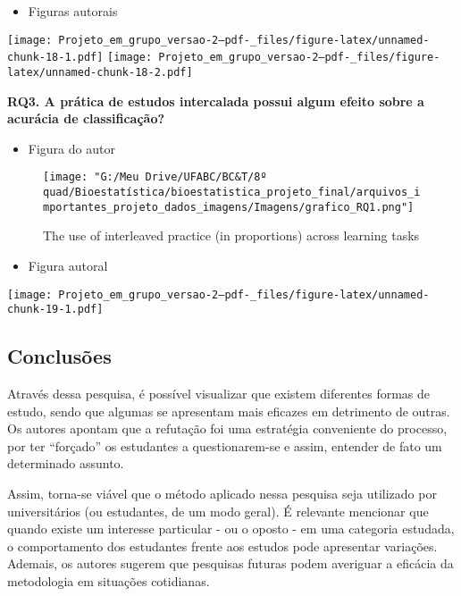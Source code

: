 \documentclass[
]{article}
\providecommand{\tightlist}{%
  \setlength{\itemsep}{0pt}\setlength{\parskip}{0pt}}
\begin{document}
\begin{itemize}
\tightlist
\item
  Figuras autorais
\end{itemize}

\texttt{[image: Projeto\_em\_grupo\_versao-2--pdf-\_files/figure-latex/unnamed-chunk-18-1.pdf]}
\texttt{[image: Projeto\_em\_grupo\_versao-2--pdf-\_files/figure-latex/unnamed-chunk-18-2.pdf]}

\textbf{RQ3. A prática de estudos intercalada possui algum efeito sobre
a acurácia de classificação?}

\begin{itemize}
\tightlist
\item
  Figura do autor
\end{itemize}

\begin{figure}
\centering
\texttt{[image: "G:/Meu Drive/UFABC/BC\&T/8º quad/Bioestatística/bioestatistica\_projeto\_final/arquivos\_importantes\_projeto\_dados\_imagens/Imagens/grafico\_RQ1.png"]}
\caption{The use of interleaved practice (in proportions) across
learning tasks}
\end{figure}

\begin{itemize}
\tightlist
\item
  Figura autoral
\end{itemize}

\texttt{[image: Projeto\_em\_grupo\_versao-2--pdf-\_files/figure-latex/unnamed-chunk-19-1.pdf]}

\subsection{Conclusões}\label{conclusuxf5es}

Através dessa pesquisa, é possível visualizar que existem diferentes
formas de estudo, sendo que algumas se apresentam mais eficazes em
detrimento de outras. Os autores apontam que a refutação foi uma
estratégia conveniente do processo, por ter ``forçado'' os estudantes a
questionarem-se e assim, entender de fato um determinado assunto.

Assim, torna-se viável que o método aplicado nessa pesquisa seja
utilizado por universitários (ou estudantes, de um modo geral). É
relevante mencionar que quando existe um interesse particular - ou o
oposto - em uma categoria estudada, o comportamento dos estudantes
frente aos estudos pode apresentar variações. Ademais, os autores
sugerem que pesquisas futuras podem averiguar a eficácia da metodologia
em situações cotidianas.
\end{document}
